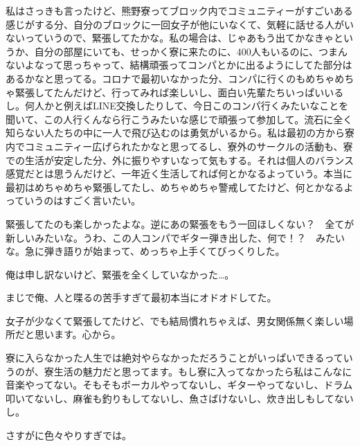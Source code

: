 \begin{multicols}{2}
私はさっきも言ったけど、熊野寮ってブロック内でコミュニティーがすごいある感じがする分、自分のブロックに一回女子が他にいなくて、気軽に話せる人がいないっていうので、緊張してたかな。私の場合は、じゃあもう出てかなきゃというか、自分の部屋にいても、せっかく寮に来たのに、400人もいるのに、つまんないよなって思っちゃって、結構頑張ってコンパとかに出るようにしてた部分はあるかなと思ってる。コロナで最初いなかった分、コンパに行くのもめちゃめちゃ緊張してたんだけど、行ってみれば楽しいし、面白い先輩たちいっぱいいるし。何人かと例えばLINE交換したりして、今日このコンパ行くみたいなことを聞いて、この人行くんなら行こうみたいな感じで頑張って参加して。流石に全く知らない人たちの中に一人で飛び込むのは勇気がいるから。私は最初の方から寮内でコミュニティー広げられたかなと思ってるし、寮外のサークルの活動も、寮での生活が安定した分、外に振りやすいなって気もする。それは個人のバランス感覚だとは思うんだけど、一年近く生活してれば何とかなるよっていう。本当に最初はめちゃめちゃ緊張してたし、めちゃめちゃ警戒してたけど、何とかなるよっていうのはすごく言いたい。

緊張してたのも楽しかったよな。逆にあの緊張をもう一回ほしくない？　全てが新しいみたいな。うわ、この人コンパでギター弾き出した、何で！？　みたいな。急に弾き語りが始まって、めっちゃ上手くてびっくりした。

俺は申し訳ないけど、緊張を全くしていなかった…。

まじで俺、人と喋るの苦手すぎて最初本当にオドオドしてた。

女子が少なくて緊張してたけど、でも結局慣れちゃえば、男女関係無く楽しい場所だと思います。心から。

寮に入らなかった人生では絶対やらなかっただろうことがいっぱいできるっていうのが、寮生活の魅力だと思ってます。もし寮に入ってなかったら私はこんなに音楽やってない。そもそもボーカルやってないし、ギターやってないし、ドラム叩いてないし、麻雀も釣りもしてないし、魚さばけないし、炊き出しもしてないし。

さすがに色々やりすぎでは。


\end{multicols}
